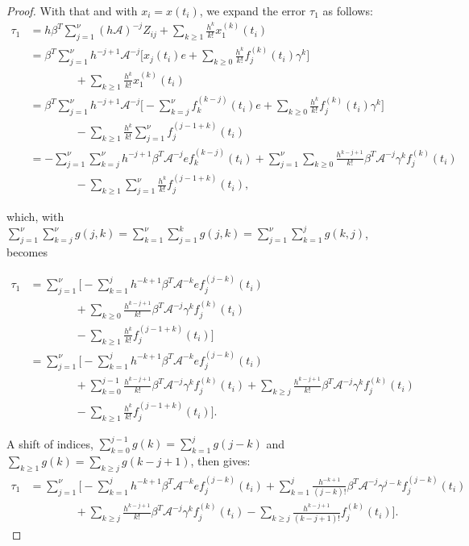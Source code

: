 \documentclass[]{book}
\theoremstyle{definition}
\theoremstyle{definition}
\theoremstyle{definition}
\theoremstyle{definition}
\theoremstyle{remark}
\begin{document}
\begin{proof}
With that and with \(x_i=x(t_i)\), we expand the error \(\tau_1\) as follows:
\begin{align*}
\tau_1 &= h\beta^T\sum_{j=1}^\nu (h\mathcal A)^{-j}Z_{ij} + \sum_{k\geq 1} \frac{h^k}{k!}x_1^{(k)}(t_i)\\
&= \beta^T\sum_{j=1}^\nu h^{-j+1}\mathcal A^{-j}\Bigg[ x_{j}(t_i)e+\sum_{k\geq 0} \frac{h^k}{k!}f_j^{(k)}(t_i)\gamma^k\Bigg] \\&\quad\quad\quad\quad+ \sum_{k\geq 1} \frac{h^k}{k!}x_1^{(k)}(t_i)\\
&= \beta^T\sum_{j=1}^\nu h^{-j+1}\mathcal A^{-j}\Bigg[ -\sum_{k=j}^{\nu}f_k^{(k-j)}(t_i)e+\sum_{k\geq 0} \frac{h^k}{k!}f_j^{(k)}(t_i)\gamma^k\Bigg] \\&\quad\quad\quad\quad- \sum_{k\geq 1} \frac{h^k}{k!} \sum_{j=1}^{\nu}f_j^{(j-1+k)}(t_i)\\
&= -\sum_{j=1}^\nu \sum_{k=j}^{\nu} h^{-j+1}\beta^T\mathcal A^{-j} ef_k^{(k-j)}(t_i)+\sum_{j=1}^\nu \sum_{k\geq 0}\frac{h^{k-j+1}}{k!}\beta^T\mathcal A^{-j} \gamma^k f_j^{(k)}(t_i) \\&\quad\quad\quad\quad- \sum_{k\geq 1}\sum_{j=1}^{\nu} \frac{h^k}{k!} f_j^{(j-1+k)}(t_i),
\end{align*}

which, with \(\sum_{j=1}^\nu \sum_{k=j}^\nu g(j,k) = \sum_{k=1}^\nu \sum_{j=1}^k g(j,k)= \sum_{j=1}^\nu \sum_{k=1}^j g(k,j)\), becomes

\begin{align*}
\tau_1 &= \sum_{j=1}^{\nu} \Bigg[ -\sum_{k=1}^j h^{-k+1}\beta^T\mathcal A^{-k} ef_j^{(j-k)}(t_i)\\&\quad\quad\quad\quad+\sum_{k\geq 0}\frac{h^{k-j+1}}{k!}\beta^T\mathcal A^{-j} \gamma^k f_j^{(k)}(t_i) \\&\quad\quad\quad\quad- \sum_{k\geq 1}\frac{h^k}{k!} f_j^{(j-1+k)}(t_i) \Bigg] \\
 &= \sum_{j=1}^{\nu} \Bigg[ -\sum_{k=1}^j h^{-k+1}\beta^T\mathcal A^{-k} ef_j^{(j-k)}(t_i)\\
 &\quad\quad\quad\quad+\sum_{k=0}^{j-1}\frac{h^{k-j+1}}{k!}\beta^T\mathcal A^{-j} \gamma^k f_j^{(k)}(t_i)+\sum_{k\geq j}\frac{h^{k-j+1}}{k!}\beta^T\mathcal A^{-j} \gamma^k f_j^{(k)}(t_i) \\&\quad\quad\quad\quad- \sum_{k\geq 1}\frac{h^k}{k!} f_j^{(j-1+k)}(t_i) \Bigg].
\end{align*}

A shift of indices, \(\sum_{k=0}^{j-1}g(k)=\sum_{k=1}^j g(j-k)\) and \(\sum_{k\geq 1}g(k)=\sum_{k\geq j}g(k-j+1)\), then gives:
\begin{align*}
    \tau_1 &= \sum_{j=1}^{\nu} \Bigg[ -\sum_{k=1}^j h^{-k+1}\beta^T\mathcal A^{-k} ef_j^{(j-k)}(t_i)+\sum_{k=1}^{j}\frac{h^{-k+1}}{(j-k)!}\beta^T\mathcal A^{-j} \gamma^{j-k} f_j^{(j-k)}(t_i)\\ &\quad\quad\quad\quad+\sum_{k\geq j}\frac{h^{k-j+1}}{k!}\beta^T\mathcal A^{-j} \gamma^k f_j^{(k)}(t_i) - \sum_{k\geq j}\frac{h^{k-j+1}}{(k-j+1)!} f_j^{(k)}(t_i) \Bigg].
\end{align*}


\end{proof}
\end{document}
